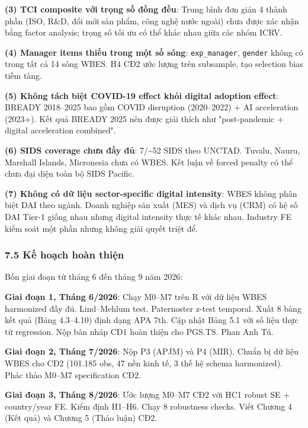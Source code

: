 \documentclass[12pt,a4paper]{article}
\begin{document}
\textbf{(3) TCI composite với trọng số đồng đều}: Trung bình đơn giản 4
thành phần (ISO, R\&D, đổi mới sản phẩm, công nghệ nước ngoài) chưa được
xác nhận bằng factor analysis; trọng số tối ưu có thể khác nhau giữa các
nhóm ICRV.

\textbf{(4) Manager items thiếu trong một số sóng}:
\texttt{exp\_manager}, \texttt{gender} không có trong tất cả 14 sóng
WBES. H4 CĐ2 ước lượng trên subsample, tạo selection bias tiềm tàng.

\textbf{(5) Không tách biệt COVID-19 effect khỏi digital adoption
effect}: BREADY 2018--2025 bao gồm COVID disruption (2020--2022) + AI
acceleration (2023+). Kết quả BREADY 2025 nên được giải thích như
"post-pandemic + digital acceleration combined".

\textbf{(6) SIDS coverage chưa đầy đủ}: 7/\textasciitilde52 SIDS theo
UNCTAD. Tuvalu, Nauru, Marshall Islands, Micronesia chưa có WBES. Kết
luận về forced penalty có thể chưa đại diện toàn bộ SIDS Pacific.

\textbf{(7) Không có dữ liệu sector-specific digital intensity}: WBES
không phân biệt DAI theo ngành. Doanh nghiệp sản xuất (MES) và dịch vụ
(CRM) có hệ số DAI Tier-1 giống nhau nhưng digital intensity thực tế
khác nhau. Industry FE kiểm soát một phần nhưng không giải quyết triệt
để.

\hypertarget{75-kux1ebf-houx1ea1ch-houxe0n-thiux1ec7n}{%
\subsubsection{7.5 Kế hoạch hoàn
thiện}\label{75-kux1ebf-houx1ea1ch-houxe0n-thiux1ec7n}}

Bốn giai đoạn từ tháng 6 đến tháng 9 năm 2026:

\textbf{Giai đoạn 1, Tháng 6/2026}: Chạy M0--M7 trên R với dữ liệu WBES
harmonized đầy đủ. Lind--Mehlum test. Paternoster z-test temporal. Xuất
8 bảng kết quả (Bảng 4.3--4.10) định dạng APA 7th. Cập nhật Bảng 5.1 với
số liệu thực từ regression. Nộp bản nháp CĐ1 hoàn thiện cho PGS.TS. Phan
Anh Tú.

\textbf{Giai đoạn 2, Tháng 7/2026}: Nộp P3 (APJM) và P4 (MIR). Chuẩn bị
dữ liệu WBES cho CĐ2 (101.185 obs, 47 nền kinh tế, 3 thế hệ schema
harmonized). Phác thảo M0--M7 specification CĐ2.

\textbf{Giai đoạn 3, Tháng 8/2026}: Ước lượng M0--M7 CĐ2 với HC1 robust
SE + country/year FE. Kiểm định H1--H6. Chạy 8 robustness checks. Viết
Chương 4 (Kết quả) và Chương 5 (Thảo luận) CĐ2.
\end{document}
